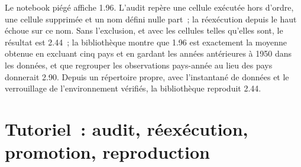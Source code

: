 \begin{omfigure}

\label{fig:pl:the-research-environment:repro}
\end{omfigure}

\begin{example}\label{ex:pl:the-research-environment:rerun}
Le notebook piégé affiche 1.96. L'audit repère une cellule exécutée hors d'ordre, une cellule supprimée et un nom défini nulle part~; la réexécution depuis le haut
échoue sur ce nom. Sans l'exclusion, et avec les cellules telles qu'elles sont, le résultat est 2.44~; la bibliothèque montre que 1.96 est exactement la
moyenne obtenue en excluant cinq pays et en gardant les années antérieures à 1950 dans les données, et que regrouper les observations pays-année au lieu des pays donnerait
2.90. Depuis un répertoire propre, avec l'instantané de données et le verrouillage de l'environnement vérifiés, la bibliothèque reproduit 2.44.
\end{example}

\section{Tutoriel~: audit, réexécution, promotion, reproduction}\label{tut:pl:the-research-environment:tut}

